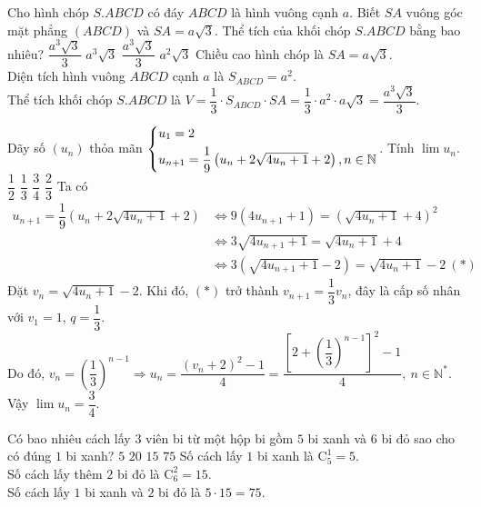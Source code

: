 \begin{ex}%
	Cho hình chóp $S.ABCD$ có đáy $ABCD$ là hình vuông cạnh $a$. Biết $SA$ vuông góc mặt phẳng $(ABCD)$ và $SA=a\sqrt{3}$. Thể tích của khối chóp $S.ABCD$ bằng bao nhiêu?
	\choice
	{\True $\dfrac{a^3\sqrt{3}}{3}$}
	{$a^3\sqrt{3}$}
	{$\dfrac{a^3\sqrt{3}}{3}$}
	{$a^2\sqrt{3}$}
	\loigiai
	{Chiều cao hình chóp là $ SA = a \sqrt{3} $.\\
		Diện tích hình vuông $ABCD$ cạnh $a$ là $S_{ABCD}=a^2$.\\
		Thể tích khối chóp $S.ABCD$ là $V=\dfrac{1}{3} \cdot S_{ABCD} \cdot SA =\dfrac{1}{3} \cdot a^2 \cdot a\sqrt{3} = \dfrac{a^3\sqrt{3}}{3}$.
	}
\end{ex}
\begin{ex}%
	Dãy số $(u_n)$ thỏa mãn $\left\{\begin{aligned}&u_1=2\\&u_{n+1}=\dfrac{1}{9}\left( u_n + 2\sqrt{4u_n+1} + 2 \right), n \in \mathbb{N} \\\end{aligned}\right.$. Tính $\lim u_n$.
	\choice
	{$\dfrac{1}{2}$}
	{$\dfrac{1}{3}$}
	{\True $\dfrac{3}{4}$}
	{$\dfrac{2}{3}$}
	\loigiai
	{
		Ta có $$\begin{aligned}
		u_{n+1}=\dfrac{1}{9}\left( u_n+2\sqrt{4u_n+1}+2\right) &\Leftrightarrow 9(4u_{n+1}+1)=\left( \sqrt{4u_n+1}+4\right)^2\\ &\Leftrightarrow 3\sqrt{4u_{n+1}+1}=\sqrt{4u_n+1}+4\\ &\Leftrightarrow 3\left( \sqrt{4u_{n+1}+1}-2\right) = \sqrt{4u_n+1}-2 \ (*)\end{aligned}$$
		Đặt $v_n=\sqrt{4u_n+1}-2$. Khi đó, $(*)$ trở thành $v_{n+1}=\dfrac{1}{3}v_n$, đây là cấp số nhân với $v_1=1$, $q=\dfrac{1}{3}.$\\
		Do đó, $v_n=\left( \dfrac{1}{3}\right)^{n-1} \Rightarrow u_n=\dfrac{(v_n+2)^2-1}{4}= \dfrac{\left[ 2+\left( \dfrac{1}{3}\right)^{n-1} \right]^2 -1}{4},\ n\in \mathbb{N}^{*}.$\\
		Vậy $\lim u_n = \dfrac{3}{4}$.
	}
\end{ex}
\begin{ex}%
	Có bao nhiêu cách lấy $3$ viên bi từ một hộp bi gồm $5$ bi xanh và $6$ bi đỏ sao cho có đúng $1$ bi xanh?
	\choice
	{$5$}
	{$20$}
	{$15$}
	{\True $75$}
	\loigiai
	{
		Số cách lấy $1$ bi xanh là $\mathrm{C}^1_5=5$.\\
		Số cách lấy thêm $2$ bi đỏ là $\mathrm{C}^2_6=15$.\\
		Số cách lấy $1$ bi xanh và $2$ bi đỏ là $5 \cdot 15 = 75$.
	}
\end{ex}
